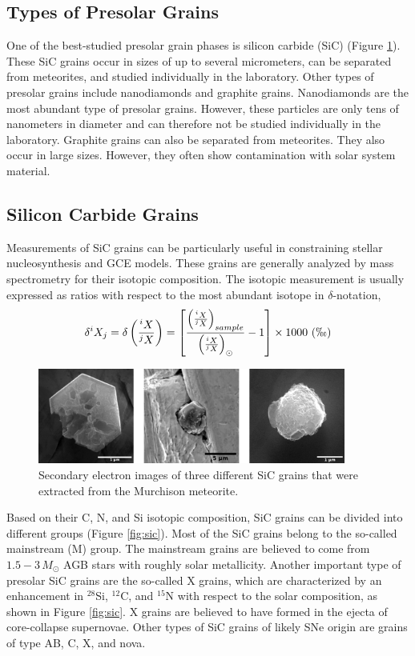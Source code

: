 \documentclass{brandeis-thesis3.2}
\def \msun {M_{\odot}}
\newcommand{\iso}[2]{$^{#1}${#2}}
\begin{document}
\subsection{Types of Presolar Grains}
One of the best-studied presolar grain phases is silicon carbide (SiC) (Figure \ref{fig:sic_pic}). These SiC grains occur in sizes of up to several micrometers, can be separated from meteorites, and studied individually in the laboratory. Other types of presolar grains include nanodiamonds and graphite grains. Nanodiamonds are the most abundant type of presolar grains. However, these particles are only tens of nanometers in diameter and can therefore not be studied individually in the laboratory. Graphite grains can also be separated from meteorites. They also occur in large sizes. However, they often show contamination with solar system material.

\subsection{Silicon Carbide Grains}
Measurements of SiC grains can be particularly useful in constraining stellar nucleosynthesis and GCE models. These grains are generally analyzed by mass spectrometry for their isotopic composition. The isotopic measurement is usually expressed as ratios with respect to the most abundant isotope in $\delta$-notation,
\begin{equation}
\delta^i X_j = \delta\left(\frac{^iX}{^jX}\right) = \left[ \frac{\left( \frac{^iX}{^jX}\right)_{sample}}{\left(\frac{^iX}{^jX}\right)_{\odot}} - 1\right] \times 1000\ (\permil)
\end{equation}

\begin{figure}[H]
\centering
\includegraphics[width= 0.9\textwidth]{figs/stardust.png}
\caption{Secondary electron images of three different SiC grains that were extracted from the Murchison meteorite.}
\label{fig:sic_pic}
\end{figure}

Based on their C, N, and Si isotopic composition, SiC grains can be divided into different groups (Figure \ref{fig:sic}). Most of the SiC grains belong to the so-called mainstream (M) group. The mainstream grains are believed to come from $1.5-3\,\msun$ AGB stars with roughly solar metallicity. Another important type of presolar SiC grains are the so-called X grains, which are characterized by an enhancement in \iso{28}{Si}, \iso{12}{C}, and \iso{15}{N} with respect to the solar composition, as shown in Figure \ref{fig:sic}. X grains are believed to have formed in the ejecta of core-collapse supernovae. Other types of SiC grains of likely SNe origin are grains of type AB, C, X, and nova. 
\end{document}
